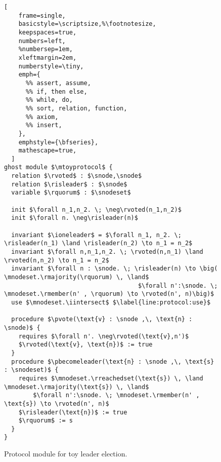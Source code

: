\begin{figure}
\begin{lstlisting}[
    frame=single,
    basicstyle=\scriptsize,%\footnotesize,
    keepspaces=true,
    numbers=left,
    %numbersep=1em,
    xleftmargin=2em,
    numberstyle=\tiny,
    emph={
      %% assert, assume,
      %% if, then else,
      %% while, do,
      %% sort, relation, function,
      %% axiom,
      %% insert,
    },
    emphstyle={\bfseries},
    mathescape=true,
  ]
ghost module $\mtoyprotocol$ {
  relation $\rvoted$ : $\snode,\snode$
  relation $\risleader$ : $\snode$
  variable $\rquorum$ : $\snodeset$

  init $\forall n_1,n_2. \; \neg\rvoted(n_1,n_2)$
  init $\forall n. \neg\risleader(n)$

  invariant $\ioneleader$ = $\forall n_1, n_2. \; \risleader(n_1) \land \risleader(n_2) \to n_1 = n_2$
  invariant $\forall n,n_1,n_2. \; \rvoted(n,n_1) \land \rvoted(n,n_2) \to n_1 = n_2$
  invariant $\forall n : \snode. \; \risleader(n) \to \big( \mnodeset.\rmajority(\rquorum) \, \land$ 
                                     $\forall n':\snode. \; \mnodeset.\rmember(n' , \rquorum) \to \rvoted(n', n)\big)$
  use $\mnodeset.\iintersect$ $\label{line:protocol:use}$

  procedure $\pvote(\text{v} : \snode ,\, \text{n} : \snode)$ {
    requires $\forall n'. \neg\rvoted(\text{v},n')$
    $\rvoted(\text{v}, \text{n})$ := true
  }
  procedure $\pbecomeleader(\text{n} : \snode ,\, \text{s} : \snodeset)$ {
    requires $\mnodeset.\rreachedset(\text{s}) \, \land \mnodeset.\rmajority(\text{s}) \, \land$
        $\forall n':\snode. \; \mnodeset.\rmember(n' , \text{s}) \to \rvoted(n', n)$
    $\risleader(\text{n})$ := true
    $\rquorum$ := s
  }
}
\end{lstlisting}
\caption{\label{fig:toyprotocol}Protocol module for toy leader election.}
\end{figure}


